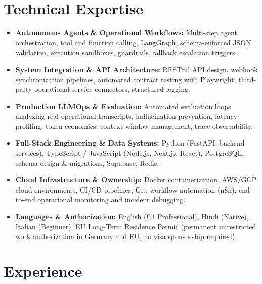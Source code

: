 \documentclass[10pt,a4paper]{article}
\begin{document}
\section{Technical Expertise}
\begin{itemize}
  \item \textbf{Autonomous Agents \& Operational Workflows:} Multi-step agent orchestration, tool and function calling, LangGraph, schema-enforced JSON validation, execution sandboxes, guardrails, fallback escalation triggers.
  \item \textbf{System Integration \& API Architecture:} RESTful API design, webhook synchronization pipelines, automated contract testing with Playwright, third-party operational service connectors, structured logging.
  \item \textbf{Production LLMOps \& Evaluation:} Automated evaluation loops analyzing real operational transcripts, hallucination prevention, latency profiling, token economics, context window management, trace observability.
  \item \textbf{Full-Stack Engineering \& Data Systems:} Python (FastAPI, backend services), TypeScript / JavaScript (Node.js, Next.js, React), PostgreSQL, schema design \& migrations, Supabase, Redis.
  \item \textbf{Cloud Infrastructure \& Ownership:} Docker containerization, AWS/GCP cloud environments, CI/CD pipelines, Git, workflow automation (n8n), end-to-end operational monitoring and incident debugging.
  \item \textbf{Languages \& Authorization:} English (C1 Professional), Hindi (Native), Italian (Beginner). EU Long-Term Residence Permit (permanent unrestricted work authorization in Germany and EU, no visa sponsorship required).
\end{itemize}

\section{Experience}
\end{document}
